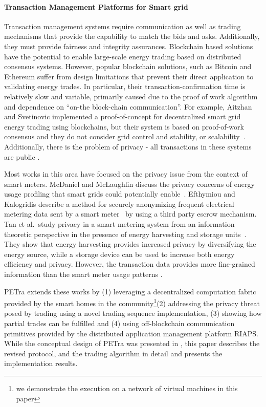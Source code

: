 \documentclass[sigplan]{acmart}
\newcommand{\Abhishek}[1]{\todo[color=yellow!50, linecolor=black!50]{\textbf{Abhishek}: #1}}
\begin{document}
\paragraph{Transaction Management Platforms for Smart grid} 
Transaction management systems require communication as well as trading mechanisms that provide the capability to match the bids and asks. Additionally, they must provide fairness and integrity assurances.  Blockchain based solutions have the potential to enable large-scale energy trading based on distributed consensus systems. However, popular blockchain solutions, such as Bitcoin \cite{NakamotoBitcoin} and Ethereum \cite{buterin2013ethereum} suffer from design limitations that prevent their direct application to validating energy trades. In particular, their transaction-confirmation time is relatively slow and variable, primarily caused due to the proof of work algorithm and dependence on ``on-the block-chain communication''.  For example, Aitzhan and Svetinovic implemented a proof-of-concept for decentralized smart grid energy trading using blockchains, but their system is based on proof-of-work consensus and they do not consider grid control and stability, or scalability~\cite{aitzhan2016security}. Additionally, there is the problem of privacy - all transactions in these systems are  public \cite{kosba2016hawk}. 

Most works in this area have focused on the privacy issue from the context of smart meters. McDaniel and McLaughlin discuss the
privacy concerns of energy usage profiling that smart grids could
potentially enable~\cite{mcdaniel2009security}. Efthymiou and Kalogridis describe a method for securely anonymizing frequent electrical metering data sent by a smart
meter~\cite{efthymiou2010smart} by using a third party escrow mechanism. Tan et
al.\ study privacy in a smart metering system from an information
theoretic perspective in the presence of energy harvesting and storage
units~\cite{tan2013increasing}. They show that energy harvesting
provides increased privacy by diversifying the energy source, while a
storage device can be used to increase both energy efficiency and
privacy. However, the transaction data provides more fine-grained information than the smart meter usage patterns \cite{Privacy2017}. 

PETra extends these works by (1) leveraging a decentralized computation fabric provided by the smart homes in the community\footnote{we demonstrate the execution on a network of virtual machines in this paper}(2) addressing the privacy
threat posed by trading using a novel trading sequence implementation, (3) showing how partial trades can be fulfilled and (4) using off-blockchain communication primitives provided by the distributed application management platform RIAPS. While the conceptual design of PETra was presented in \cite{Laszka17}, this paper describes the revised protocol, and the trading algorithm in detail and presents the implementation results. 
\end{document}
